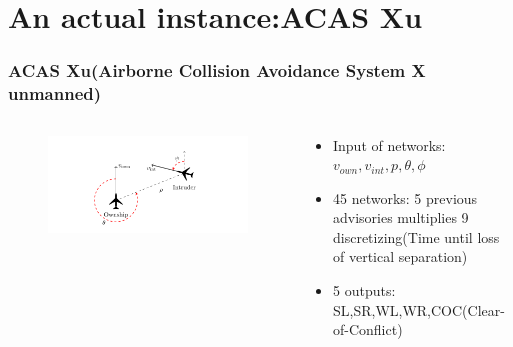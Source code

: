\documentclass[aspectratio=169%
,serif,mathserif]{beamer}
\begin{document}
\section{An actual instance:ACAS Xu}
\begin{frame}
	\frametitle{ACAS Xu(Airborne Collision Avoidance System X unmanned)}
	\begin{columns}
		\begin{column}{.6\textwidth}
			\begin{figure}
				\includegraphics[width=0.75\linewidth]{12.png}
			\end{figure}
		\end{column}

		\begin{column}{.4\textwidth}			
			\begin{itemize}
				\item Input of networks: $v_{own},v_{int},p,\theta,\phi$
				\item 45 networks: 5 previous advisories multiplies 9 discretizing(Time until loss of vertical separation)
				\item 5 outputs: SL,SR,WL,WR,COC(Clear-of-Conflict)
			\end{itemize}
		\end{column}
	\end{columns}

\end{frame}
\end{document}
